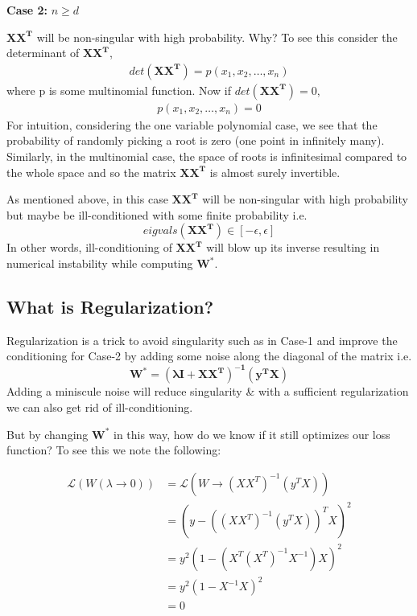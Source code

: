 \documentclass[11pt]{article}
\begin{document}
\textbf{Case 2:} ${n \geq d}$

${\mathbf{X X^T}}$ will be non-singular with high probability. Why? To see this consider the determinant of $\mathbf{XX^T}$,
\begin{equation*}
    \begin{aligned}
        det(\mathbf{XX^T}) = p(x_1, x_2, \ldots, x_n)
    \end{aligned}
\end{equation*}
where p is some multinomial function. Now if $det(\mathbf{XX^T}) = 0$,
\begin{equation*}
    \begin{aligned}
        p(x_1, x_2, \ldots, x_n) = 0 
    \end{aligned}
\end{equation*}
For intuition, considering the one variable polynomial case, we see that the probability of randomly picking a root is zero (one point in infinitely many). Similarly, in the multinomial case, the space of roots is infinitesimal compared to the whole space and so the matrix $\mathbf{XX^T}$ is almost surely invertible.

As mentioned above, in this case ${\mathbf{X X^T}}$ will be non-singular with high probability but maybe be ill-conditioned with some finite probability i.e.
        $${eigvals(\mathbf{X X^T}) \in [-\epsilon,\epsilon]}$$
In other words, ill-conditioning of ${\mathbf{X X^T}}$ will blow up its inverse resulting in numerical instability while computing ${\mathbf{W^*}}$.

\subsection{What is Regularization?}
Regularization is a trick to avoid singularity such as in Case-1 and improve the conditioning for Case-2 by adding some noise along the diagonal of the matrix i.e.
$${\mathbf{W^* = (\lambda I + X X^T)^{-1}(y^T X)}}$$
Adding a miniscule noise will reduce singularity \& with a sufficient regularization we can also get rid of ill-conditioning.

But by changing $\mathbf{W^*}$ in this way, how do we know if it still optimizes our loss function? To see this we note the following:

\begin{equation*}
    \begin{aligned}
        \mathcal{L}(W(\lambda \rightarrow 0)) &= \mathcal{L}(W \rightarrow (XX^T)^{-1}(y^T X)) \\
        &= (y - ((XX^T)^{-1}(y^T X))^T X)^2\\
        &= y^2(1-(X^T (X^T)^{-1} X^{-1}) X)^2\\
        &= y^2(1 - X^{-1}X)^2\\
        &= 0
    \end{aligned}
\end{equation*}
\end{document}

